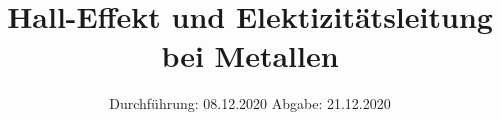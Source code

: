 

\subject{V311}
\title{Hall-Effekt und Elektizitätsleitung bei Metallen}
\date{%
  Durchführung: 08.12.2020
  \hspace{3em}
  Abgabe: 21.12.2020
}



\maketitle
\thispagestyle{empty}
\tableofcontents
\newpage







\printbibliography{}


